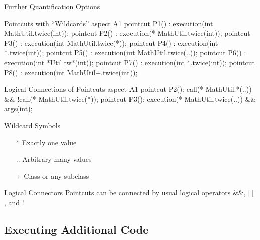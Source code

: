 \begin{frame}[fragile]{Further Quantification Options}
	\begin{mycolumns}[widths={70,30},animation=none]
\begin{codetight}{Pointcuts with ``Wildcards''}
aspect A1 {
	pointcut P1() : execution(int MathUtil.twice(int));
	pointcut P2() : execution(* MathUtil.twice(int));
	pointcut P3() : execution(int MathUtil.twice(*));
	pointcut P4() : execution(int *.twice(int));
	pointcut P5() : execution(int MathUtil.twice(..));
	pointcut P6() : execution(int *Util.tw*(int));
	pointcut P7() : execution(int *.twice(int));
	pointcut P8() : execution(int MathUtil+.twice(int));
}
\end{codetight}
\begin{codetight}{Logical Connections of Pointcuts}
aspect A1 {
	pointcut P2(): call(* MathUtil.*(..)) && !call(* MathUtil.twice(*));
	pointcut P3(): execution(* MathUtil.twice(..)) && args(int);
}
\end{codetight}
	\mynextcolumn
		\begin{note}{Wildcard Symbols}
			\begin{itemize}
				\item [*] Exactly one value
				\item [..] Arbitrary many values
				\item [+] Class or any subclass
			\end{itemize}
		\end{note}
		
		\vspace{1cm}
		
		\begin{note}{Logical Connectors}
			Pointcuts can be connected by usual logical operators \&\&, $\mid\mid$, and !
		\end{note}
	\end{mycolumns}
\end{frame}

\subsection{Executing Additional Code}

